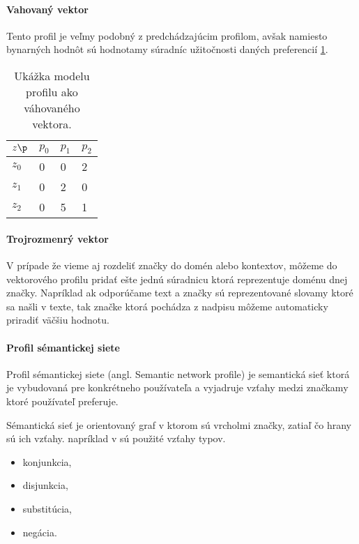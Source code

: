 \paragraph{Vahovaný vektor}

Tento profil je veľmy podobný z predchádzajúcim profilom, avšak namiesto bynarných 
hodnôt sú hodnotamy súradníc užitočnosti daných preferencií \ref{table:weightprofile}.

\begin{table}[h]
\begin{center}
\begin{tabular}{|l|l|l|l|}
\hline
\(z\p\)  & \(p_0\) & \(p_1\) & \(p_2\) \\ \hline
\(z_0\) & 0     & 0        & 2        \\ \hline
\(z_1\) & 0     & 2        & 0        \\ \hline
\(z_2\) & 0     & 5        & 1        \\ \hline
\end{tabular}
\end{center}
\caption{Ukážka modelu profilu ako váhovaného vektora.}
\label{table:weightprofile}
\end{table}

\paragraph{Trojrozmenrý vektor}

V prípade že vieme aj rozdeliť značky do domén alebo kontextov,
môžeme do vektorového profilu pridať ešte jednú súradnicu ktorá reprezentuje
doménu dnej značky. Napríklad ak odporúčame text a značky sú
reprezentované slovamy ktoré sa našli v texte, tak značke ktorá pochádza 
z nadpisu môžeme automaticky priradiť väčšiu hodnotu.

\paragraph{Profil sémantickej siete}

Profil sémantickej siete (angl. Semantic network profile) je semantická sieť
ktorá je vybudovaná pre konkrétneho používateľa a vyjadruje vzťahy medzi značkamy
ktoré používateľ preferuje.


Sémantická sieť\cite{semantic_networks} je orientovaný graf v ktorom sú vrcholmi značky,
zatiaľ čo hrany sú ich vzťahy.
napríklad v \cite{basic_user_profiles} sú použité vzťahy typov.

\begin{itemize}
\item{konjunkcia,}
\item{disjunkcia,}
\item{substitúcia,}
\item{negácia.}
\end{itemize}

